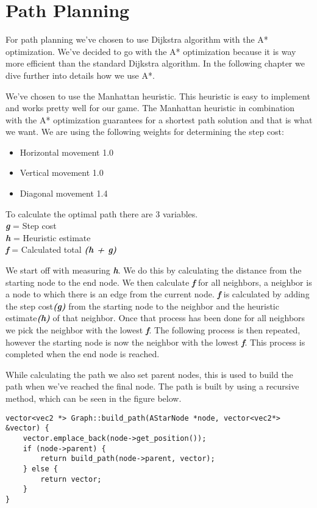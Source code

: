 \section{Path Planning}
\label{sec:pathplanning}
For path planning we’ve chosen to use Dijkstra algorithm with the A* optimization. We've decided to go with the A* optimization because it is way more efficient than the standard Dijkstra algorithm\cite{rbgames}. In the following chapter we dive further into details how we use A*.

We’ve chosen to use the Manhattan heuristic. This heuristic is easy to implement and works pretty well for our game. The Manhattan heuristic in combination with the A* optimization guarantees for a shortest path solution and that is what we want. We are using the following weights for determining the step cost:
\begin{itemize}
\item Horizontal movement 1.0
\item Vertical movement 1.0
\item Diagonal movement 1.4
\end{itemize}

To calculate the optimal path there are 3 variables. \\
\textbf{\textit{g}} = Step cost \\
\textbf{\textit{h}} = Heuristic estimate \\ 
\textbf{\textit{f}} = Calculated total  \textbf{\textit{(h + g)}}

We start off with measuring \textbf{\textit{h}}. We do this by calculating the distance from the starting node to the end node. We then calculate \textbf{\textit{f}} for all neighbors, a neighbor is a node to which there is an edge from the current node. \textbf{\textit{f}} is calculated by adding the step cost\textbf{\textit{(g)}} from the starting node to the neighbor and the heuristic estimate\textbf{\textit{(h)}} of that neighbor. Once that process has been done for all neighbors we pick the neighbor with the lowest \textbf{\textit{f}}. The following process is then repeated, however the starting node is now the neighbor with the lowest \textbf{\textit{f}}. This process is completed when the end node is reached.

While calculating the path we also set parent nodes, this is used to build the path when we’ve reached the final node. The path is built by using a recursive method, which can be seen in the figure below. 

\begin{lstlisting}
vector<vec2 *> Graph::build_path(AStarNode *node, vector<vec2*> &vector) {
    vector.emplace_back(node->get_position());
    if (node->parent) {
        return build_path(node->parent, vector);
    } else {
        return vector;
    }
}
\end{lstlisting}
